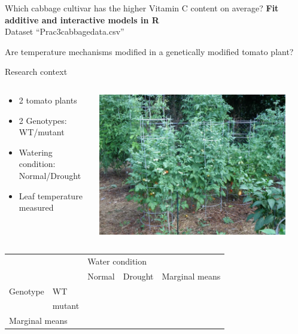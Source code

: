 \documentclass{beamer}
\begin{document}

\begin{frame}{Which cabbage cultivar has the higher Vitamin C content on average?}
 \textbf{Fit additive and interactive models in R}\\
 Dataset ``Prac3cabbagedata.csv''
\end{frame}


\begin{frame}{Are temperature mechanisms modified in a genetically modified tomato plant?}
 \begin{block}{Research context}
 \begin{columns}
  \begin{column}{0.8\textwidth}
   \begin{itemize}
    \item 2 tomato plants
    \item 2 Genotypes: WT/mutant 
    \item Watering condition: Normal/Drought
    \item Leaf temperature measured
   \end{itemize}
  \end{column}
  \begin{column}{0.2\textwidth}
    \includegraphics[width=0.9\textwidth]{Figures/tomato}
  \end{column}

 \end{columns}
 \end{block}

   \pause
 
 \begin{center}
\begin{tabular}{|l | l | l | l | l |}
\toprule
  \multicolumn{2}{|l|}{} & \multicolumn{2}{l|}{Water condition} &\\
  \cmidrule(lr){3-5}
  \multicolumn{2}{|l|}{}  & Normal & Drought & Marginal means\\
 	    \midrule
      Genotype & WT &  & &\\
      \cmidrule(lr){2-5}
		& mutant &  & &\\
		\midrule
\multicolumn{2}{|l|}{Marginal means} &  & &\\	
	    \bottomrule
  \end{tabular}
\end{center}
 

\end{frame}
\end{document}
